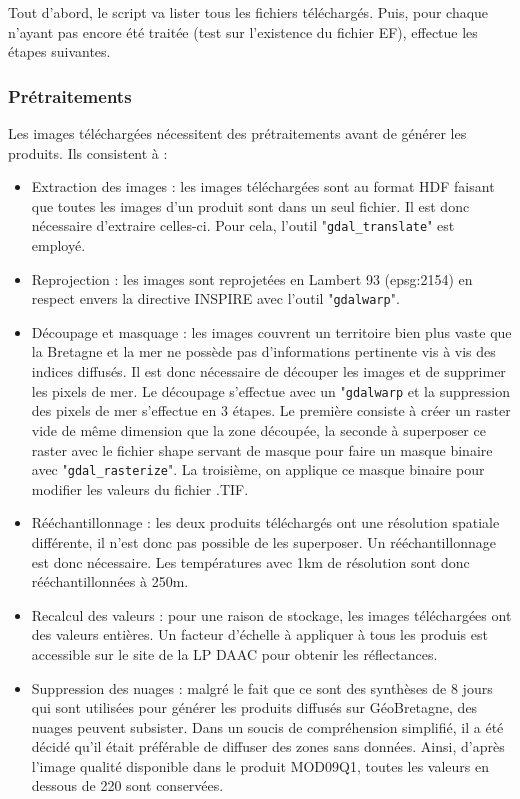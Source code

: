 \documentclass[10pt,a4paper]{article}
\begin{document}
Tout d'abord, le script va lister tous les fichiers téléchargés. Puis, pour chaque n'ayant pas encore été traitée (test sur l'existence du fichier EF), effectue les étapes suivantes.

\subsubsection{Prétraitements}

Les images téléchargées nécessitent des prétraitements avant de générer les produits. Ils consistent à :

\begin{itemize}
\item Extraction des images : les images téléchargées sont au format HDF faisant que toutes les images d'un produit sont dans un seul fichier. Il est donc nécessaire d'extraire celles-ci. Pour cela, l'outil "\verb!gdal_translate!" est employé. 
\item Reprojection : les images sont reprojetées en Lambert 93 (epsg:2154) en respect envers la directive INSPIRE avec l'outil "\verb!gdalwarp!".
\item Découpage et masquage : les images couvrent un territoire bien plus vaste que la Bretagne et la mer ne possède pas d'informations pertinente vis à vis des indices diffusés. Il est donc nécessaire de découper les images et de supprimer les pixels de mer. Le découpage s'effectue avec un "\verb!gdalwarp! et la suppression des pixels de mer s'effectue en 3 étapes. Le première consiste à créer un raster vide de même dimension que la zone découpée, la seconde à superposer ce raster avec le fichier shape servant de masque pour faire un masque binaire avec "\verb!gdal_rasterize!". La troisième, on applique ce masque binaire pour modifier les valeurs du fichier .TIF.
\item Rééchantillonnage : les deux produits téléchargés ont une résolution spatiale différente, il n'est donc pas possible de les superposer. Un rééchantillonnage est donc nécessaire. Les températures avec 1km de résolution sont donc rééchantillonnées à 250m.
\item Recalcul des valeurs : pour une raison de stockage, les images téléchargées ont des valeurs entières. Un facteur d’échelle à appliquer à tous les produis est accessible sur le site de la LP DAAC pour obtenir les réflectances.
\item Suppression des nuages : malgré le fait que ce sont des synthèses de 8 jours qui sont utilisées pour générer les produits diffusés sur GéoBretagne, des nuages peuvent subsister. Dans un soucis de compréhension simplifié, il a été décidé qu'il était préférable de diffuser des zones sans données. Ainsi, d'après l'image qualité disponible dans le produit MOD09Q1, toutes les valeurs en dessous de 220 sont conservées.
\end{itemize}
\end{document}
